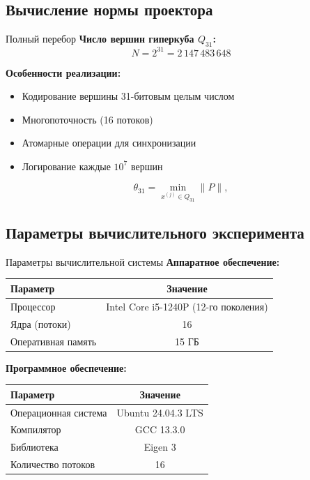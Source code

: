 \documentclass{beamer}
\begin{document}
\subsection{Вычисление нормы проектора}
\begin{frame}{Полный перебор}
    \textbf{Число вершин гиперкуба $Q_{31}$:}
    \[
    N = 2^{31} = 2\,147\,483\,648
    \]

    \vspace{0.3cm}

    \textbf{Особенности реализации:}
    \begin{itemize}
        \item Кодирование вершины 31-битовым целым числом
        \item Многопоточность (16 потоков)
        \item Атомарные операции для синхронизации
        \item Логирование каждые $10^7$ вершин
    \end{itemize}

    \vspace{0.3cm}

    \[
    \theta_{31} = \min_{x^{(j)} \in Q_{31}} \|P\|,
    \]
\end{frame}

\subsection{Параметры вычислительного эксперимента}
\begin{frame}{Параметры вычислительной системы}
    \textbf{Аппаратное обеспечение:}
    \begin{table}
    \centering
    \begin{tabular}{l|c}
    \hline
    \textbf{Параметр} & \textbf{Значение} \\
    \hline
    Процессор & Intel Core i5-1240P (12-го поколения) \\
    Ядра (потоки) & 16 \\
    Оперативная память & 15 ГБ \\
    \hline
    \end{tabular}
    \end{table}

    \vspace{0.5cm}

    \textbf{Программное обеспечение:}
    \begin{table}
    \centering
    \begin{tabular}{l|c}
    \hline
    \textbf{Параметр} & \textbf{Значение} \\
    \hline
    Операционная система & Ubuntu 24.04.3 LTS \\
    Компилятор & GCC 13.3.0 \\
    Библиотека & Eigen 3 \\
    Количество потоков & 16 \\
    \hline
    \end{tabular}
    \end{table}
\end{frame}
\end{document}
